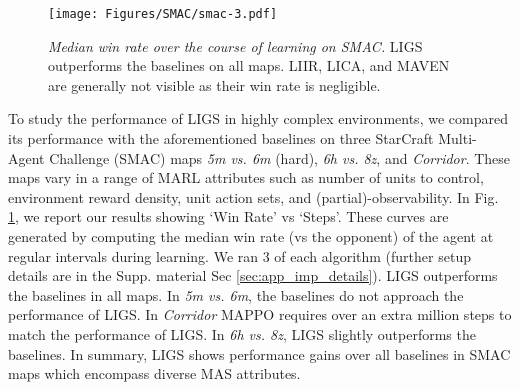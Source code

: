 \documentclass{article}
\begin{document}
\begin{figure}
    \centering
    \texttt{[image: Figures/SMAC/smac-3.pdf]}
    \caption{\emph{Median win rate over the course of learning on SMAC.} LIGS outperforms the baselines on all maps. LIIR, LICA, and MAVEN are generally not visible as their win rate is negligible.}
    \label{Figure:SMAC_learning_curves}
\end{figure}
% 
% 
To study the performance of LIGS in highly complex environments, we compared its performance with the aforementioned baselines on three StarCraft Multi-Agent Challenge (SMAC) maps \cite{samvelyan2019starcraft} \emph{5m vs. 6m} (hard), \emph{6h vs. 8z}, and \emph{Corridor}.
These maps vary in a range of MARL attributes such as number of units to control, environment reward density, unit action sets, and (partial)-observability. In Fig. \ref{Figure:SMAC_learning_curves}, we report our results showing `Win Rate' vs `Steps'. These curves are generated by computing the median win rate (vs the opponent) of the agent at regular intervals during learning. We ran $3$ of each algorithm (further setup details are in the Supp. material Sec \ref{sec:app_imp_details}). LIGS outperforms the baselines in all maps. In \emph{5m vs. 6m}, the baselines do not approach the performance of LIGS. In  \emph{Corridor} MAPPO requires over an extra million steps to match the performance of LIGS. In \emph{6h vs. 8z}, LIGS slightly outperforms the baselines. 
In summary, LIGS shows performance gains over all baselines in SMAC maps which encompass diverse MAS attributes.
\end{document}

